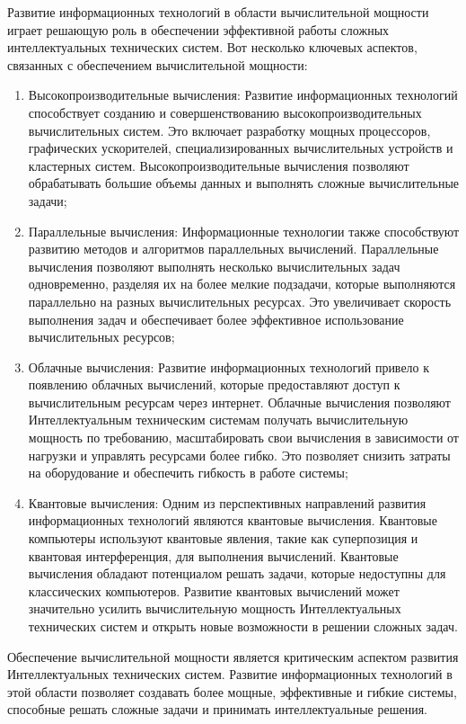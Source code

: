     Развитие информационных технологий в области вычислительной мощности играет решающую роль в обеспечении эффективной работы сложных интеллектуальных технических систем. Вот несколько ключевых аспектов, связанных с обеспечением вычислительной мощности:
    \begin{enumerate}
        \item Высокопроизводительные вычисления: Развитие информационных технологий способствует созданию и совершенствованию высокопроизводительных вычислительных систем. Это включает разработку мощных процессоров, графических ускорителей, специализированных вычислительных устройств и кластерных систем. Высокопроизводительные вычисления позволяют обрабатывать большие объемы данных и выполнять сложные вычислительные задачи;
        \item Параллельные вычисления: Информационные технологии также способствуют развитию методов и алгоритмов параллельных вычислений. Параллельные вычисления позволяют выполнять несколько вычислительных задач одновременно, разделяя их на более мелкие подзадачи, которые выполняются параллельно на разных вычислительных ресурсах. Это увеличивает скорость выполнения задач и обеспечивает более эффективное использование вычислительных ресурсов;
        \item Облачные вычисления: Развитие информационных технологий привело к появлению облачных вычислений, которые предоставляют доступ к вычислительным ресурсам через интернет. Облачные вычисления позволяют Интеллектуальным техническим системам получать вычислительную мощность по требованию, масштабировать свои вычисления в зависимости от нагрузки и управлять ресурсами более гибко. Это позволяет снизить затраты на оборудование и обеспечить гибкость в работе системы;
        \item Квантовые вычисления: Одним из перспективных направлений развития информационных технологий являются квантовые вычисления. Квантовые компьютеры используют квантовые явления, такие как суперпозиция и квантовая интерференция, для выполнения вычислений. Квантовые вычисления обладают потенциалом решать задачи, которые недоступны для классических компьютеров. Развитие квантовых вычислений может значительно усилить вычислительную мощность Интеллектуальных технических систем и открыть новые возможности в решении сложных задач.
    \end{enumerate}

    Обеспечение вычислительной мощности является критическим аспектом развития Интеллектуальных технических систем. Развитие информационных технологий в этой области позволяет создавать более мощные, эффективные и гибкие системы, способные решать сложные задачи и принимать интеллектуальные решения.

